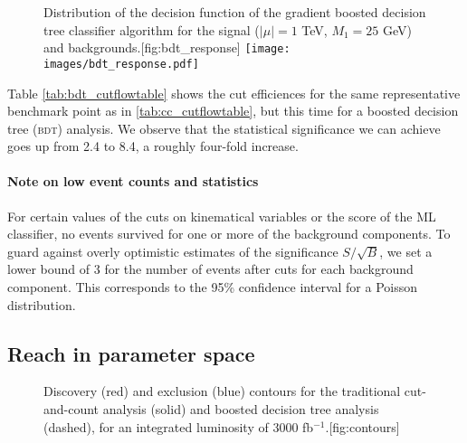 \begin{figure}
\begin{sidecaption}{Distribution of the decision function of the gradient boosted decision tree classifier algorithm for the signal ($|\mu| = 1$ TeV, $M_1 = 25$ GeV) and backgrounds.}[fig:bdt_response]
\centering
\texttt{[image: images/bdt\_response.pdf]}
\end{sidecaption}
\end{figure}

\begin{table}
  \begin{adjustwidth}{-1.5in}{0in}
  \centering
  
  \caption{Representative cut flow table for the same benchmark point and integrated luminosity as in \autoref{tab:cc_cutflowtable}, but using a boosted decision tree (BDT) analysis instead. The preselection is equivalent to the trigger and identification cuts listed in \autoref{tab:cc_cutflowtable}. As before, all the cross sections are in femtobarns.}
\label{tab:bdt_cutflowtable}
\end{adjustwidth}
\end{table}

Table \ref{tab:bdt_cutflowtable} shows the cut efficiences for the same representative benchmark point as in \autoref{tab:cc_cutflowtable}, but this time for a boosted decision tree (\textsc{bdt}) analysis. We observe that the statistical significance we can achieve goes up from 2.4 to 8.4, a roughly four-fold increase.

\paragraph{Note on low event counts and statistics} For certain values of the cuts on kinematical variables or the score of the ML classifier, no events survived for one or more of the background components. To guard against overly optimistic estimates of the significance $S/\sqrt{B}$, we set a lower bound of 3 for the number of events after cuts for each background component. This corresponds to the 95\% confidence interval for a Poisson distribution.

\subsection{Reach in parameter space}
\begin{figure}
\strictpagecheck
  \begin{sidecaption}{Discovery (red) and exclusion (blue) contours for the traditional cut-and-count analysis (solid) and boosted decision tree analysis (dashed), for an integrated luminosity of 3000 fb$^{-1}$.}[fig:contours]
\centering

\end{sidecaption}

\end{figure}

